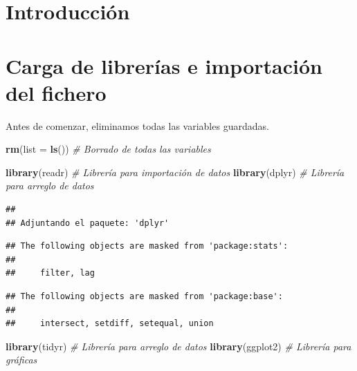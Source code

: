 \documentclass[data,article,submit,moreauthors,pdftex]{Definitions/mdpi}
\newenvironment{Shaded}{\begin{snugshade}}{\end{snugshade}}
\newcommand{\AttributeTok}[1]{\textcolor[rgb]{0.13,0.29,0.53}{#1}}
\newcommand{\CommentTok}[1]{\textcolor[rgb]{0.56,0.35,0.01}{\textit{#1}}}
\newcommand{\FunctionTok}[1]{\textcolor[rgb]{0.13,0.29,0.53}{\textbf{#1}}}
\newcommand{\NormalTok}[1]{#1}
\begin{document}

\section{Introducción}\label{introducciuxf3n}

\section{Carga de librerías e importación del
fichero}\label{carga-de-libreruxedas-e-importaciuxf3n-del-fichero}

Antes de comenzar, eliminamos todas las variables guardadas.

\begin{Shaded}
\begin{Highlighting}[]
\FunctionTok{rm}\NormalTok{(}\AttributeTok{list =} \FunctionTok{ls}\NormalTok{())  }\CommentTok{\# Borrado de todas las variables}
\end{Highlighting}
\end{Shaded}

\begin{Shaded}
\begin{Highlighting}[]
\FunctionTok{library}\NormalTok{(readr)  }\CommentTok{\# Librería para importación de datos}
\FunctionTok{library}\NormalTok{(dplyr)  }\CommentTok{\# Librería para arreglo de datos}
\end{Highlighting}
\end{Shaded}

\begin{verbatim}
## 
## Adjuntando el paquete: 'dplyr'
\end{verbatim}

\begin{verbatim}
## The following objects are masked from 'package:stats':
## 
##     filter, lag
\end{verbatim}

\begin{verbatim}
## The following objects are masked from 'package:base':
## 
##     intersect, setdiff, setequal, union
\end{verbatim}

\begin{Shaded}
\begin{Highlighting}[]
\FunctionTok{library}\NormalTok{(tidyr)  }\CommentTok{\# Librería para arreglo de datos}
\FunctionTok{library}\NormalTok{(ggplot2)  }\CommentTok{\# Librería para gráficas}
\end{Highlighting}
\end{Shaded}
\end{document}
